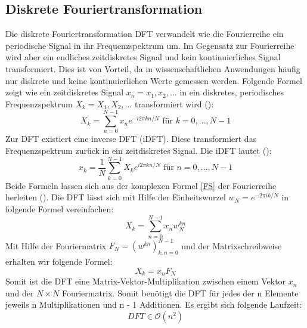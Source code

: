 \subsection{Diskrete Fouriertransformation}
Die diskrete Fouriertransformation DFT verwandelt wie die Fourierreihe ein periodische Signal in ihr Frequenzspektrum um. Im Gegensatz zur Fourierreihe wird aber ein endliches zeitdiskretes Signal und kein kontinuierliches Signal transformiert.
Dies ist von Vorteil, da in wissenschaftlichen Anwendungen häufig nur diskrete und keine kontinuierlichen Werte gemessen werden.
Folgende Formel zeigt wie ein zeitdiskretes Signal $x_{n} = x_{1}, x_{2},...$ in ein diskretes, periodisches Frequenzspektrum $X_{k} = X_{1}, X_{2},...$ transformiert wird (\cite[S.17]{and 12}):
\begin{equation}
X_{k}= \sum_{n=0}^{N-1} x_{n} e^{-i2 \pi kn /N} \text{  für } k=0,...,N-1
\label{eq:DFT}
\end{equation}
Zur DFT existiert eine inverse DFT (iDFT). Diese transformiert das Frequenzspektrum zurück in ein zeitdiskretes Signal.
Die iDFT lautet (\cite[S.20]{and 12}):
\begin{equation}
x_{k}= \frac{1}{N}\sum_{k=0}^{N-1} X_{k} e^{i2 \pi kn /N} \text{  für }  n=0,...,N-1
\label{idft}
\end{equation}
Beide Formeln lassen sich aus der komplexen Formel \ref{FS} der Fourierreihe herleiten (\cite[S. 77-79]{ser 17}). Die DFT lässt sich mit Hilfe der Einheitswurzel $w_{N} = e^{-2 \pi ik /N}$ in folgende Formel vereinfachen:
\begin{equation}
X_{k}= \sum_{n=0}^{N-1} x_{n} w_{N}^{kn}
\end{equation}
Mit Hilfe der Fouriermatrix $F_{N} = (w^{kn})_{k,n=0}^{N-1}$ und der Matrixschreibweise erhalten wir folgende Formel:
\begin{equation}
X_{k} = x_{n}F_{N}
\label{eq:dft fouriermatrix}
\end{equation}
Somit ist die DFT eine Matrix-Vektor-Multiplikation zwischen einem Vektor $x_n$ und der $N \times N$ Fouriermatrix.
Somit benötigt die DFT für jedes der n Elemente jeweils n Multiplikationen und  n - 1 Additionen. Es ergibt sich folgende Laufzeit: 
\begin{equation}
DFT \in \mathcal O(n^2)
\end{equation}

